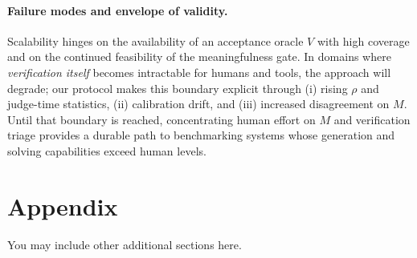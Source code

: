 \documentclass{article} %
\begin{document}
\paragraph{Failure modes and envelope of validity.}
Scalability hinges on the availability of an acceptance oracle $V$ with high coverage and on the continued feasibility of the meaningfulness gate. In domains where \emph{verification itself} becomes intractable for humans and tools, the approach will degrade; our protocol makes this boundary explicit through (i) rising $\rho$ and judge-time statistics, (ii) calibration drift, and (iii) increased disagreement on $M$. Until that boundary is reached, concentrating human effort on $M$ and verification triage provides a durable path to benchmarking systems whose generation and solving capabilities exceed human levels.









\appendix
\section{Appendix}
You may include other additional sections here.
\end{document}
